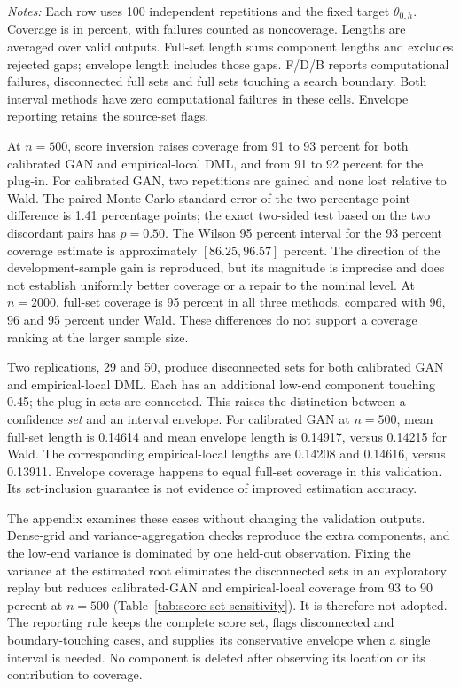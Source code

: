 \begin{table}[htbp]
\centering
\small
\caption{Independent validation of Wald intervals and full score sets}
\label{tab:fresh-score-validation}

\begin{minipage}{0.98\textwidth}
\footnotesize
\emph{Notes:} Each row uses 100 independent repetitions and the fixed target
$\theta_{0,h}$. Coverage is in percent, with failures counted as noncoverage.
Lengths are averaged over valid outputs. Full-set length sums component
lengths and excludes rejected gaps; envelope length includes those gaps.
F/D/B reports computational failures, disconnected full sets and full sets
touching a search boundary. Both interval methods have zero computational
failures in these cells. Envelope reporting retains the source-set flags.
\end{minipage}
\end{table}

At $n=500$, score inversion raises coverage from 91 to 93 percent for both
calibrated GAN and empirical-local DML, and from 91 to 92 percent for the
plug-in. For calibrated GAN, two repetitions are gained and none lost relative
to Wald. The paired Monte Carlo standard error of the two-percentage-point
difference is 1.41 percentage points; the exact two-sided test based on the
two discordant pairs has $p=0.50$. The Wilson 95 percent interval for the
93 percent coverage estimate is approximately $[86.25,96.57]$ percent.
The direction of the development-sample gain is reproduced, but its magnitude
is imprecise and does not establish uniformly better coverage or a repair to
the nominal level. At $n=2000$, full-set coverage is 95 percent in all three
methods, compared with 96, 96 and 95 percent under Wald. These differences do
not support a coverage ranking at the larger sample size.

Two replications, 29 and 50, produce disconnected sets for both
calibrated GAN and empirical-local DML. Each has an additional low-end
component touching 0.45; the plug-in sets are connected. This raises the
distinction between a confidence \emph{set} and an interval envelope.
For calibrated GAN at $n=500$, mean full-set length is 0.14614 and mean
envelope length is 0.14917, versus 0.14215 for Wald. The corresponding
empirical-local lengths are 0.14208 and 0.14616, versus 0.13911.
Envelope coverage happens to equal full-set coverage in this validation.
Its set-inclusion guarantee is not evidence of improved estimation accuracy.

The appendix examines these cases without changing the validation outputs.
Dense-grid and variance-aggregation checks reproduce the extra components,
and the low-end variance is dominated by one held-out observation. Fixing the
variance at the estimated root eliminates the disconnected sets in an
exploratory replay but reduces calibrated-GAN and empirical-local coverage
from 93 to 90 percent at $n=500$ (Table~\ref{tab:score-set-sensitivity}).
It is therefore not adopted. The reporting rule keeps the complete score set,
flags disconnected and boundary-touching cases, and supplies its conservative
envelope when a single interval is needed. No component is deleted after
observing its location or its contribution to coverage.

